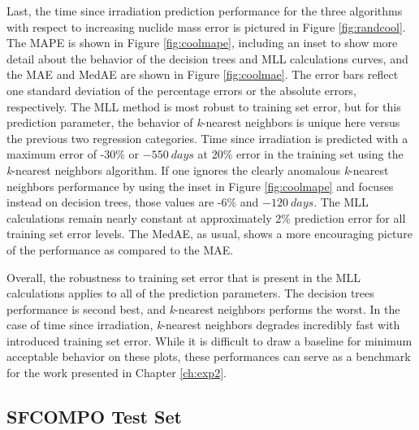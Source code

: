 Last, the time since irradiation prediction performance for the three
algorithms with respect to increasing nuclide mass error is pictured in Figure
\ref{fig:randcool}.  The \gls{MAPE} is shown in Figure \ref{fig:coolmape},
including an inset to show more detail about the behavior of the decision trees
and \gls{MLL} calculations curves, and the \gls{MAE} and \gls{MedAE} are shown
in Figure \ref{fig:coolmae}.  The error bars reflect one standard deviation of
the percentage errors or the absolute errors, respectively.  The \gls{MLL}
method is most robust to training set error, but for this prediction parameter,
the behavior of \textit{k}-nearest neighbors is unique here versus the previous
two regression categories.  Time since irradiation is predicted with a maximum
error of -30\% or $-550\:days$ at 20\% error in the training set using the
\textit{k}-nearest neighbors algorithm.  If one ignores the clearly anomalous
\textit{k}-nearest neighbors performance by using the inset in Figure
\ref{fig:coolmape} and focuses instead on decision trees, those values are -6\%
and $-120\:days$.  The \gls{MLL} calculations remain nearly constant at
approximately 2\% prediction error for all training set error levels.  The
\gls{MedAE}, as usual, shows a more encouraging picture of the performance as
compared to the \gls{MAE}.

Overall, the robustness to training set error that is present in the \gls{MLL}
calculations applies to all of the prediction parameters. The decision trees
performance is second best, and \textit{k}-nearest neighbors performs the
worst.  In the case of time since irradiation, \textit{k}-nearest neighbors
degrades incredibly fast with introduced training set error.  While it is
difficult to draw a baseline for minimum acceptable behavior on these plots,
these performances can serve as a benchmark for the work presented in Chapter
\ref{ch:exp2}. 



\subsection{SFCOMPO Test Set}
\label{sec:sfcompo}

